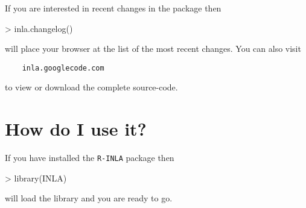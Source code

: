\documentclass[a4paper,11pt]{report}
\newcommand{\tv}{\texttt}
\begin{document}
If you are interested in recent changes in the package then
\begin{Schunk}
\begin{Sinput}
> inla.changelog()
\end{Sinput}
\end{Schunk}
will place your browser at the list of the most recent changes. You can also visit
\begin{verbatim}
    inla.googlecode.com
\end{verbatim}
to view or download the complete source-code. 



\section{How do I use it?}

If you have installed the \tv{R-INLA} package then
\begin{Schunk}
\begin{Sinput}
> library(INLA)
\end{Sinput}
\end{Schunk}
will load the library and you are ready to go. 
\end{document}
